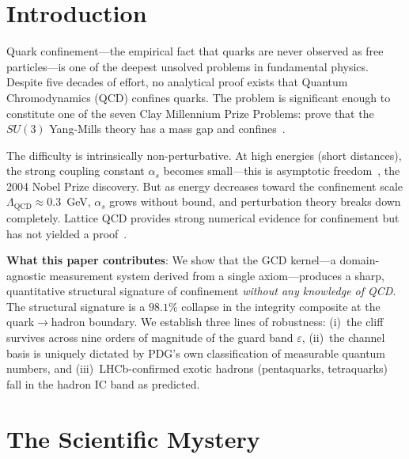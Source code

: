 \documentclass[
  aps,
  prd,
  twocolumn,
  superscriptaddress,
  nofootinbib,
  floatfix
]{revtex4-2}
\newcommand{\eps}{\varepsilon}
\newcommand{\LQCD}{\Lambda_{\mathrm{QCD}}}
\begin{document}
\maketitle

\section{Introduction}\label{sec:intro}

Quark confinement---the empirical fact that quarks are never
observed as free particles---is one of the deepest unsolved
problems in fundamental physics.  Despite five decades of effort,
no analytical proof exists that Quantum Chromodynamics (QCD)
confines quarks.  The problem is significant enough to constitute
one of the seven Clay Millennium Prize Problems: prove that the
$SU(3)$ Yang-Mills theory has a mass gap and
confines~\cite{jaffe2006quantum}.

The difficulty is intrinsically non-perturbative.  At high energies
(short distances), the strong coupling constant $\alpha_s$ becomes
small---this is asymptotic freedom~\cite{gross1973,politzer1973},
the 2004 Nobel Prize discovery.  But as energy decreases toward the
confinement scale $\LQCD \approx 0.3$~GeV, $\alpha_s$ grows without
bound, and perturbation theory breaks down completely.  Lattice QCD
provides strong numerical evidence for confinement but has not
yielded a proof~\cite{wilson1974confinement}.

\textbf{What this paper contributes}: We show that the GCD
kernel---a domain-agnostic measurement system derived from a
single axiom---produces a sharp, quantitative structural signature
of confinement \emph{without any knowledge of QCD}.  The
structural signature is a $98.1\%$ collapse in the integrity
composite at the quark$\to$hadron boundary.  We establish three
lines of robustness: (i)~the cliff survives across nine orders
of magnitude of the guard band $\eps$,
(ii)~the channel basis is uniquely dictated by PDG's own
classification of measurable quantum numbers, and
(iii)~LHCb-confirmed exotic hadrons (pentaquarks, tetraquarks)
fall in the hadron IC band as predicted.


\section{The Scientific Mystery}\label{sec:mystery}
\end{document}
